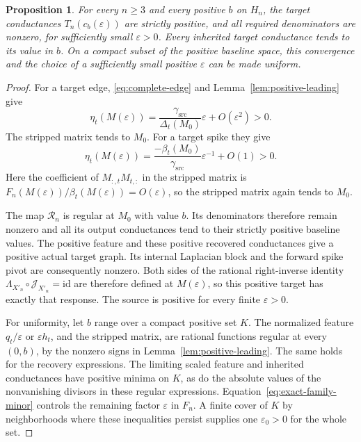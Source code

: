 \documentclass[11pt]{article}
\newtheorem{proposition}[theorem]{Proposition}
\theoremstyle{definition}
\newcommand{\rec}{\mathcal R}
\newcommand{\chart}{\mathcal J}
\begin{document}
\begin{proposition}
\label{prop:positive-family}
For every $n\ge3$ and every positive $b$ on $H_n$,
the target conductances $T_n(c_b(\varepsilon))$ are strictly positive,
and all required denominators are nonzero, for sufficiently small \(\varepsilon>0\).
Every inherited target conductance tends to its value in \(b\).
On a compact subset of the positive baseline space, this convergence
and the choice of a sufficiently small positive \(\varepsilon\)
can be made uniform.
\end{proposition}
\begin{proof}
For a target edge, \eqref{eq:complete-edge} and
Lemma~\ref{lem:positive-leading} give
\[
 \eta_t(M(\varepsilon))
 =\frac{\gamma_{\mathrm{src}}}{\Delta_t(M_0)}\varepsilon+O(\varepsilon^2)>0 .
\]
The stripped matrix tends to \(M_0\).
For a target spike they give
\[
 \eta_t(M(\varepsilon))
 =\frac{-\beta_t(M_0)}{\gamma_{\mathrm{src}}}\varepsilon^{-1}+O(1)>0 .
\]
Here the coefficient of \(M_{:,t}M_{t,:}\) in the stripped matrix
is \(F_n(M(\varepsilon))/\beta_t(M(\varepsilon))=O(\varepsilon)\),
so the stripped matrix again tends to \(M_0\).

The map \(\rec_n\) is regular at \(M_0\) with value \(b\).
Its denominators therefore remain nonzero and all its output
conductances tend to their strictly positive baseline values.
The positive feature and these positive recovered conductances
give a positive actual target graph. Its internal Laplacian block
and the forward spike pivot are consequently nonzero.
Both sides of the rational right-inverse identity
\(\Lambda_{X'_n}\circ\chart_{X'_n}=\mathrm{id}\) are therefore
defined at \(M(\varepsilon)\), so this positive target has exactly
that response.
The source is positive for every finite \(\varepsilon>0\).

For uniformity, let \(b\) range over a compact positive set \(K\).
The normalized feature \(q_t/\varepsilon\) or
\(\varepsilon h_t\), and the stripped matrix, are rational functions
regular at every \((0,b)\), by the nonzero signs in
Lemma~\ref{lem:positive-leading}.
The same holds for the recovery expressions. The limiting scaled
feature and inherited conductances have positive minima on \(K\),
as do the absolute values of the nonvanishing divisors in these
regular expressions. Equation~\eqref{eq:exact-family-minor} controls
the remaining factor \(\varepsilon\) in \(F_n\).
A finite cover of \(K\) by neighborhoods where these inequalities
persist supplies one \(\varepsilon_0>0\) for the whole set.
\end{proof}
\end{document}
